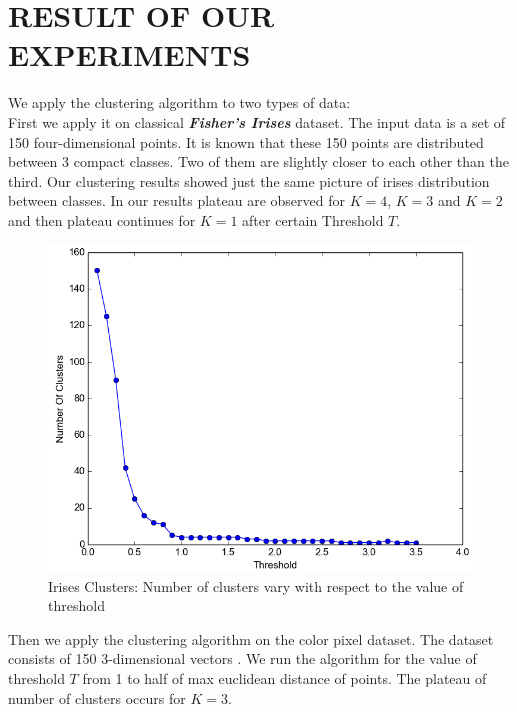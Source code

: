 \documentclass[letterpaper, 10 pt, conference]{ieeeconf}  %
\begin{document}
\section{RESULT OF OUR EXPERIMENTS}
We apply the clustering algorithm to two types of data:\\
First we apply it on classical \textit{\textbf{Fisher's Irises}} dataset.
 The input data is a set of 150 four-dimensional points. It is known that these 150 points are distributed between 3 compact classes. Two of them are slightly closer to each other than the third. Our clustering results showed just the same picture of irises distribution between classes. In our results plateau are observed for $K=4$, $K=3$ and $K=2$ and then plateau continues for $K=1$ after certain Threshold $T$.\\
\begin{figure}[H]
\includegraphics[width=\columnwidth]{figure_1.png}
\caption{Irises Clusters: Number of clusters vary with respect to the value of threshold}
\end{figure}
Then we apply the clustering algorithm on the color pixel dataset. The dataset consists of 150 3-dimensional vectors .
We run the algorithm for the value of threshold $T$ from 1 to half of max euclidean distance of points. The plateau of number of clusters occurs for $K=3$.
\end{document}
